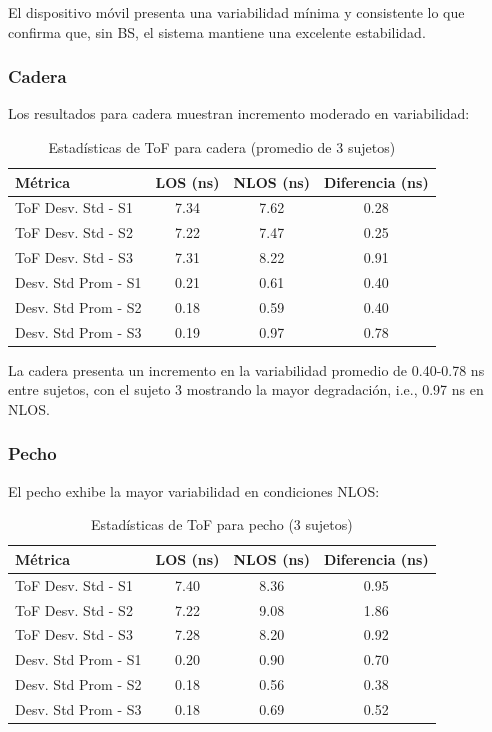 El dispositivo móvil presenta una variabilidad mínima y consistente lo que confirma que, sin BS, el sistema mantiene una excelente estabilidad.

\subsubsection{Cadera}

Los resultados para cadera muestran incremento moderado en variabilidad:
%
\begin{table}[hbt]
\centering
\caption{Estadísticas de ToF para cadera (promedio de 3 sujetos)}
\label{tab:tof_cadera}
\begin{tabular}{lccc}
\hline
\rowcolor{headerblue}
\textbf{Métrica} & \textbf{LOS (ns)} & \textbf{NLOS (ns)} & \textbf{Diferencia (ns)} \\
\hline
ToF Desv. Std - S1 & 7.34 & 7.62 & 0.28 \\
ToF Desv. Std - S2 & 7.22 & 7.47 & 0.25 \\
ToF Desv. Std - S3 & 7.31 & 8.22 & 0.91 \\
Desv. Std Prom - S1 & 0.21 & 0.61 & 0.40 \\
Desv. Std Prom - S2 & 0.18 & 0.59 & 0.40 \\
Desv. Std Prom - S3 & 0.19 & 0.97 & 0.78 \\
\hline
\end{tabular}
\end{table}

La cadera presenta un incremento en la variabilidad promedio de 0.40-0.78 ns entre sujetos, con el sujeto 3 mostrando la mayor degradación, i.e., 0.97 ns en NLOS.

\subsubsection{Pecho}

El pecho exhibe la mayor variabilidad en condiciones NLOS:
%
\begin{table}[hbt]
\centering
\caption{Estadísticas de ToF para pecho (3 sujetos)}
\label{tab:tof_pecho}
\begin{tabular}{lccc}
\hline
\rowcolor{headerblue}
\textbf{Métrica} & \textbf{LOS (ns)} & \textbf{NLOS (ns)} & \textbf{Diferencia (ns)} \\
\hline
ToF Desv. Std - S1 & 7.40 & 8.36 & 0.95 \\
ToF Desv. Std - S2 & 7.22 & 9.08 & 1.86 \\
ToF Desv. Std - S3 & 7.28 & 8.20 & 0.92 \\
Desv. Std Prom - S1 & 0.20 & 0.90 & 0.70 \\
Desv. Std Prom - S2 & 0.18 & 0.56 & 0.38 \\
Desv. Std Prom - S3 & 0.18 & 0.69 & 0.52 \\
\hline
\end{tabular}
\end{table}

